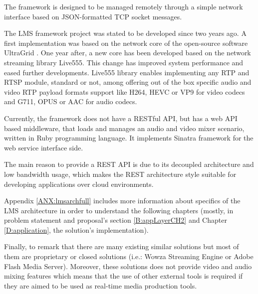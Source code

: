 The framework is designed to be managed remotely through a simple network interface based on JSON-formatted TCP socket messages. 

The LMS framework project was stated to be developed since two years ago. A first implementation was based on the network core of the open-source software UltraGrid \cite{ug}. One year after, a new core has been developed based on the network streaming library Live555. This change has improved system performance and eased further developments. Live555 library enables implementing any RTP and RTSP module, standard or not, among offering out of the box specific audio and video RTP payload formats support like H264, HEVC or VP9 for video codecs and G711, OPUS or AAC for audio codecs.

Currently, the framework does not have a RESTful API, but has a web API based middleware, that loads and manages an audio and video mixer scenario, written in Ruby programming language. It implements Sinatra framework for the web service interface side.

The main reason to provide a REST API is due to its decoupled architecture and low bandwidth usage, which makes the REST architecture style suitable for developing applications over cloud environments.

Appendix \ref{ANX:lmsarchfull} includes more information about specifics of the LMS architecture in order to understand the following chapters (mostly, in problem statement and proposal's section \ref{B:appLayerCH2} and Chapter \ref{D:application}, the solution's implementation).

Finally, to remark that there are many existing similar solutions but most of them are proprietary or closed solutions (i.e.: Wowza Streaming Engine or Adobe Flash Media Server). Moreover, these solutions does not provide video and audio mixing features which means that the use of other external tools is required if they are aimed to be used as real-time media production tools.
